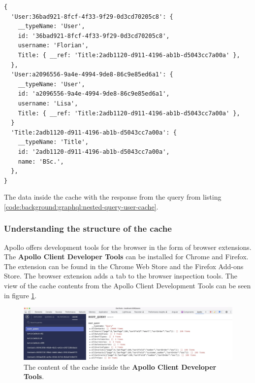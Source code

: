 \ifshowListings
\begin{listing}[H]
    \begin{verbatim}
{
  'User:36bad921-8fcf-4f33-9f29-0d3cd70205c8': {
    __typeName: 'User',
    id: '36bad921-8fcf-4f33-9f29-0d3cd70205c8',
    username: 'Florian',
    Title: { __ref: 'Title:2adb1120-d911-4196-ab1b-d5043cc7a00a' },
  },
  'User:a2096556-9a4e-4994-9de8-86c9e85ed6a1': {
    __typeName: 'User',
    id: 'a2096556-9a4e-4994-9de8-86c9e85ed6a1',
    username: 'Lisa',
    Title: { __ref: 'Title:2adb1120-d911-4196-ab1b-d5043cc7a00a' },
  }
  'Title:2adb1120-d911-4196-ab1b-d5043cc7a00a': {
    __typeName: 'Title',
    id: '2adb1120-d911-4196-ab1b-d5043cc7a00a',
    name: 'BSc.',
  },
}
    \end{verbatim}
    \caption{The data inside the cache with the response from the query from listing \ref{code:background:graphql:nested-query-user-cache}.}\label{code:background:graphql:nested-query-user-cache-representation}
\end{listing}
\fi

\subsubsection{Understanding the structure of the cache}\label{subsubsection:background:graphql:apollo-server-client:understanding-cache-structure}

Apollo offers development tools for the browser in the form of browser extensions. The \textbf{Apollo Client Developer Tools} can be installed for Chrome and Firefox. The extension can be found in the Chrome Web Store and the Firefox Add-ons Store. The browser extension adds a tab to the browser inspection tools. \cite{misc:-:background:graphql:apollo-developer-tools} The view of the cache contents from the Apollo Client Development Tools can be seen in figure \ref{fig:background:graphql:apollo:apollo-dev-tools}.

\ifshowImages
  \begin{figure}[H]
    \centering
    \includegraphics[width=1\linewidth]{images/background/graphql/apollo/apollo-dev-tools.jpg}
    \caption{The content of the cache inside the \textbf{Apollo Client Developer Tools}.}\label{fig:background:graphql:apollo:apollo-dev-tools}
  \end{figure}
\fi


